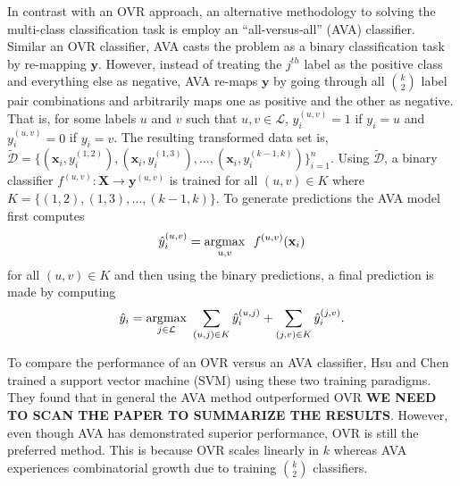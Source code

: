 \documentclass[../thesis.tex]{subfiles}
\begin{document}
In contrast with an OVR approach, an alternative methodology to solving the
multi-class classification task is employ an ``all-versus-all'' (AVA)
classifier. Similar an OVR classifier, AVA casts the problem as a binary
classification task by re-mapping $\mathbf{y}$. However, instead of treating the
$j^{th}$ label as the positive class and everything else as negative, AVA
re-maps $\mathbf{y}$ by going through all $\binom{k}{2}$ label pair combinations
and arbitrarily maps one as positive and the other as negative. That is, for
some labels $u$ and $v$ such that $u, v \in \mathcal{L}$, $y_i^{(u,v)} = 1$ if
$y_i = u$ and $y_i^{(u,v)} = 0$ if $y_i = v$. The resulting transformed data set
is, $\widetilde{\mathcal{D}} = \{(\mathbf{x}_i, y_i^{(1,2)}), (\mathbf{x}_i,
y_i^{(1,3)}), \ldots, (\mathbf{x}_i, y_i^{(k-1, k)})\}_{i=1}^n$. Using
$\widetilde{\mathcal{D}}$, a binary classifier $f^{(u,v)}: \mathbf{X}
\rightarrow \mathbf{y}^{(u,v)}$ is trained for all $(u, v) \in K$ where $K =
\{(1, 2), (1, 3), \ldots, (k-1, k)\}$. To generate predictions the AVA model
first computes
\begin{equation}
    \hat{y}_i^{(u,v)} = \underset{u, v}{\argmax} \ \ f^{(u,v)}(\mathbf{x}_i)
\end{equation}
for all $(u,v) \in K$ and then using the binary predictions, a final prediction
is made by computing
\begin{equation}
    \hat{y}_i = \underset{j \in \mathcal{L}}{\operatorname*{argmax}} \ \sum_{(u, j) \in K}
    \hat{y}_i^{(u, j)} + \sum_{(j, v) \in K} \hat{y}_i^{(j, v)}.
\end{equation}

To compare the performance of an OVR versus an AVA classifier, Hsu and Chen
\cite{hsu2002comparison} trained a support vector machine (SVM) using these two
training paradigms. They found that in general the AVA method outperformed OVR
\textbf{WE NEED TO SCAN THE PAPER TO SUMMARIZE THE RESULTS}. However, even
though AVA has demonstrated superior performance, OVR is still the preferred
method. This is because OVR scales linearly in $k$ whereas AVA experiences
combinatorial growth due to training $\binom{k}{2}$ classifiers.
\end{document}
